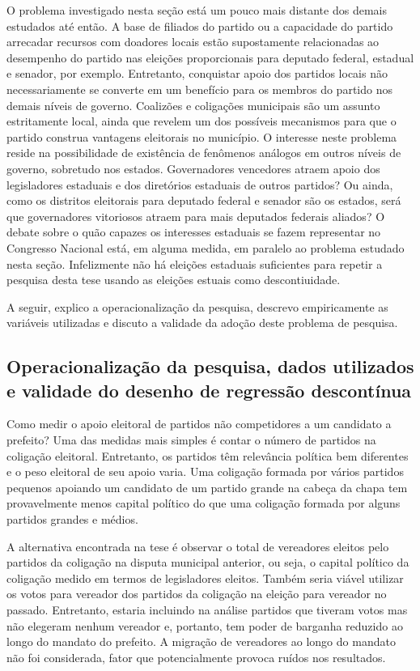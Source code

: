 O problema investigado nesta seção está um pouco mais distante dos demais estudados até então. A base de filiados do partido ou a capacidade do partido arrecadar recursos com doadores locais estão supostamente relacionadas ao desempenho do partido nas eleições proporcionais para deputado federal, estadual e senador, por exemplo. Entretanto, conquistar apoio dos partidos locais não necessariamente se converte em um benefício para os membros do partido nos demais níveis de governo. Coalizões e coligações municipais são um assunto estritamente local, ainda que revelem um dos possíveis mecanismos para que o partido construa vantagens eleitorais no município. O interesse neste problema reside na possibilidade de existência de fenômenos análogos em outros níveis de governo, sobretudo nos estados. Governadores vencedores atraem apoio dos legisladores estaduais e dos diretórios estaduais de outros partidos? Ou ainda, como os distritos eleitorais para deputado federal e senador são os estados, será que governadores vitoriosos atraem para mais deputados federais aliados? O debate sobre o quão capazes os interesses estaduais se fazem representar no Congresso Nacional está, em alguma medida, em paralelo ao problema estudado nesta seção. Infelizmente não há eleições estaduais suficientes para repetir a pesquisa desta tese usando as eleições estuais como descontiuidade.

A seguir, explico a operacionalização da pesquisa, descrevo empiricamente as variáveis utilizadas e discuto a validade da adoção deste problema de pesquisa.

\subsection{Operacionalização da pesquisa, dados utilizados e validade do desenho de regressão descontínua}

Como medir o apoio eleitoral de partidos não competidores a um candidato a prefeito? Uma das medidas mais simples é contar o número de partidos na coligação eleitoral. Entretanto, os partidos têm relevância política bem diferentes e o peso eleitoral de seu apoio varia. Uma coligação formada por vários partidos pequenos apoiando um candidato de um partido grande na cabeça da chapa tem provavelmente menos capital político do que uma coligação formada por alguns partidos grandes e médios.

A alternativa encontrada na tese é observar o total de vereadores eleitos pelo partidos da coligação na disputa municipal anterior, ou seja, o capital político da coligação medido em termos de legisladores eleitos. Também seria viável utilizar os votos para vereador dos partidos da coligação na eleição para vereador no passado. Entretanto, estaria incluindo na análise partidos que tiveram votos mas não elegeram nenhum vereador e, portanto, tem poder de barganha reduzido ao longo do mandato do prefeito. A migração de vereadores ao longo do mandato não foi considerada, fator que potencialmente provoca ruídos nos resultados.

